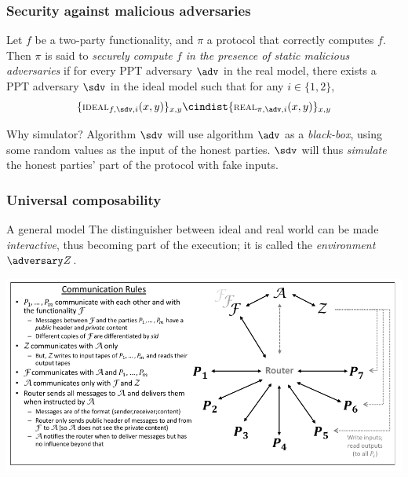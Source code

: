 \documentclass{beamer}
\begin{document}
    \begin{frame}
        \frametitle{Security against malicious adversaries}
        
        \begin{definition}
            Let $f$ be a two-party functionality, and $\pi$ a protocol that correctly computes $f$. Then $\pi$ is said to \emph{securely compute $f$ in the presence of static malicious adversaries} if for every PPT adversary $\adv$ in the real model, there exists a PPT adversary $\sdv$ in the ideal model such that for any $i\in\{1,2\}$,
            $$ \{ \textsc{\scriptsize IDEAL}_{f,\sdv,i}(x,y) \}_{x,y} \cindist \{ \textsc{\scriptsize REAL}_{\pi,\adv,i}(x,y) \}_{x,y}$$
        \end{definition}
    
        \begin{exampleblock}{Why simulator?}
            Algorithm $\sdv$ will use algorithm $\adv$ as a \emph{black-box}, using some random values as the input of the honest parties. $\sdv$ will thus \emph{simulate} the honest parties' part of the protocol with fake inputs.
        \end{exampleblock}
    \end{frame}


    \begin{frame}
        \frametitle{Universal composability}
        
        \begin{block}{A general model}
            The distinguisher between ideal and real world can be made \emph{interactive}, thus becoming part of the execution; it is called the \emph{environment} $\zdv$.
        \end{block}
        
        \begin{center}
            \includegraphics[width=\textwidth]{router}
        \end{center}
    \end{frame}
\end{document}
